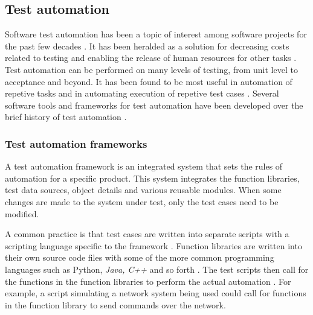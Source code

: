 \documentclass[english,12pt,a4paper,pdftex,elec,utf8]{aaltothesis}
\begin{document}
\subsection{Test automation}
Software test automation has been a topic of interest among software projects for the past few decades \cite{testautomationconf2013}. It has been heralded as a solution for decreasing costs related to testing and enabling the release of human resources for other tasks \cite{workshopontestautomation, kasurinentesting}. Test automation can be performed on many levels of testing, from unit level to acceptance and beyond. It has been found to be most useful in automation of repetive tasks and in automating execution of repetive test cases \cite{kasurinentesting}. Several software tools and frameworks for test automation have been developed over the brief history of test automation \cite{testautomationconf2013, kasurinentesting}. \par 
\subsubsection{Test automation frameworks}
A test automation framework is an integrated system that sets the rules of automation for a specific product. This system integrates the function libraries, test data sources, object details and various reusable modules. When some changes are made to the system under test, only the test cases need to be modified. \cite{exploringuseofta} \par
A common practice is that test cases are written into separate scripts with a scripting language specific to the framework \cite{robotmain, exploringuseofta}. Function libraries are written into their own source code files with some of the more common programming languages such as Python, \textit{Java, C++} and so forth \cite{robotmain, modelbasedtesting}.
The test scripts then call for the functions in the function libraries to perform the actual automation \cite{modelbasedtesting}. For example, a script simulating a network system being used could call for functions in the function library to send commands over the network.\par 
\end{document}
